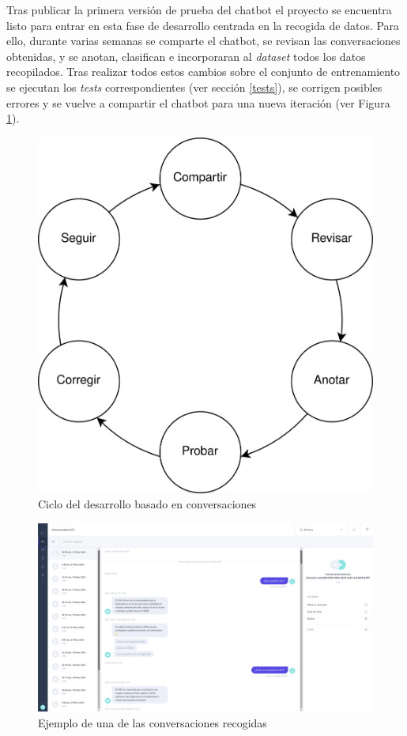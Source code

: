 Tras publicar la primera versión de prueba del chatbot el proyecto se encuentra listo para entrar en esta fase de desarrollo centrada en la recogida de datos. Para ello, durante varias semanas se comparte el chatbot, se revisan las conversaciones obtenidas, y se anotan, clasifican e incorporaran al \textit{dataset} todos los datos recopilados. Tras realizar todos estos cambios sobre el conjunto de entrenamiento se ejecutan los \textit{tests} correspondientes (ver sección \ref{tests}), se corrigen posibles errores y se vuelve a compartir el chatbot para una nueva iteración (ver Figura \ref{fig:cdd}).\\

\begin{figure}[htbp]
\centering
\includegraphics[scale=0.15]{../images/cdd.png} 
\caption{Ciclo del desarrollo basado en conversaciones}
\label{fig:cdd}
\end{figure}

\begin{figure}[htbp]
\centering
\includegraphics[scale=0.3]{../images/collected_dialogs.png} 
\caption{Ejemplo de una de las conversaciones recogidas}
\label{fig:collected dialogs}
\end{figure}

